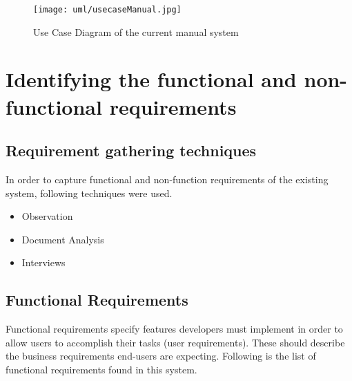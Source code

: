 \documentclass[12pt]{report}
\begin{document}
\begin{figure}[H]
	\centering
	\texttt{[image: uml/usecaseManual.jpg]}
	\caption{Use Case Diagram of the current manual system}
	\label{fig:useCaseManual}
\end{figure}

\section{Identifying the functional and non-functional requirements}

\subsection{Requirement gathering techniques}
In order to capture functional and non-function requirements of the existing system, following techniques were used.

\begin{itemize}
	\item Observation
	\item Document Analysis
	\item Interviews
\end{itemize}

\subsection{Functional Requirements}
Functional requirements specify features developers must implement in order to allow users to accomplish their tasks (user requirements).  These should describe the business requirements end-users are expecting. Following is the list of functional requirements found in this system.

\end{document}

